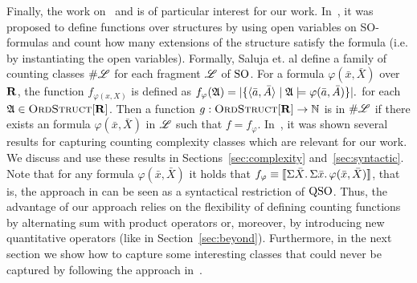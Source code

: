 Finally, the work on~\cite{SalujaST95} and \cite{Gradel91} is of particular interest for our work. 
In~\cite{SalujaST95}, it was proposed to define functions over structures by using open variables on SO-formulas and count how many extensions of the structure satisfy the formula (i.e. by instantiating the open variables). 
Formally, Saluja et. al \cite{SalujaST95} define a family of counting classes $\#\mathscr{L}$ for each fragment $\mathscr{L}$ of ${\rm SO}$. For a formula $\varphi(\bar{x},\bar{X})$ over $\mathbf{R}$, the function $f_{\varphi(x,X)}$ is defined as
$
f_{\varphi}(\mathfrak{A}) = \vert \{\langle \bar{a},\bar{A} \rangle\mid \mathfrak{A}\models\varphi(\bar{a},\bar{A})\}\vert.
$
for each $\mathfrak{A}\in\text{\sc OrdStruct}[\mathbf{R}]$. Then a function $g:\text{\sc OrdStruct}[\mathbf{R}]\to\mathbb{N}$ is in $\#\mathscr{L}$ if there exists an formula $\varphi(\bar{x},\bar{X})$ in $\mathscr{L}$ such that $f = f_{\varphi}$. 
In~\cite{SalujaST95}, it was shown several results for capturing counting complexity classes which are relevant for our work. We discuss and use these results in Sections~\ref{sec:complexity} and~\ref{sec:syntactic}.
Note that for any formula $\varphi(\bar{x},\bar{X})$ it holds that $f_\varphi \equiv {\llbracket{}{\Sigma{\bar{X}}.\, \Sigma{\bar{x}}.\, \varphi(\bar{x},\bar{X})}\rrbracket}$, that is, the approach in \cite{SalujaST95} can be seen as a syntactical restriction of ${\rm QSO}$. 
Thus, the advantage of our approach relies on the flexibility of defining  counting functions by alternating sum with product operators or, moreover, by introducing new quantitative operators (like in Section~\ref{sec:beyond}).
Furthermore, in the next section we show how to capture some interesting classes that could never be captured by following the approach in~\cite{SalujaST95}.
